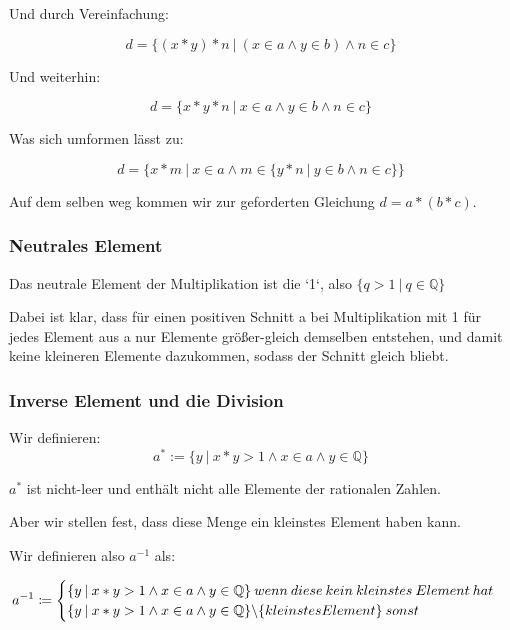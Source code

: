 \documentclass[12pt]{article}
\begin{document}
    Und durch Vereinfachung:

    \[d = \{(x * y) * n \mspace{4mu} | \mspace{4mu} (x \in a \land y \in b) \land n \in c\}\]

    Und weiterhin:

    \[d = \{x * y * n \mspace{4mu} | \mspace{4mu} x \in a \land y \in b \land n \in c\}\]

    Was sich umformen lässt zu:

    \[d = \{x * m \mspace{4mu} | \mspace{4mu} x \in a \land m \in \{y * n \mspace{4mu} | \mspace{4mu} y \in b \land n \in c\}\}\]

    Auf dem selben weg kommen wir zur geforderten Gleichung $d = a * (b * c)$.


    \subsubsection{Neutrales Element}

    Das neutrale Element der Multiplikation ist die `1`, also $\{q > 1 \mspace{4mu} | \mspace{4mu} q \in \mathbb{Q}\}$

    Dabei ist klar, dass für einen positiven Schnitt a bei Multiplikation mit 1 für jedes Element aus a nur Elemente
    größer-gleich demselben entstehen, und damit keine kleineren Elemente dazukommen, sodass der Schnitt gleich
    bliebt.

    \subsubsection{Inverse Element und die Division}

    Wir definieren:
    \[a^* := \{y \mspace{4mu} | \mspace{4mu} x * y > 1 \land x \in a \land y \in \mathbb{Q}\}\]

    $a^*$ ist nicht-leer und enthält nicht alle Elemente der rationalen Zahlen.

    Aber wir stellen fest, dass diese Menge ein kleinstes Element haben kann.

    Wir definieren also $a^{-1}$ als:

    \[
        a^{-1} \coloneqq
        \begin{cases}
            \{y \mspace{4mu} | \mspace{4mu} x * y > 1 \land x \in a \land y \in \mathbb{Q}\} \mspace{4mu} wenn
            \mspace{4mu} diese \mspace{4mu} kein \mspace{4mu} kleinstes \mspace{4mu} Element \mspace{4mu} hat \\
            \{y \mspace{4mu} | \mspace{4mu} x * y > 1 \land x \in a \land y \in \mathbb{Q}\} \symbol{'134} \{kleinstes Element\} \mspace{4mu} sonst
        \end{cases}
    \]
\end{document}
